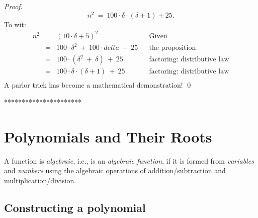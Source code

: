 {\begin{proof}
\[ n^2 \ = \ 100 \cdot \delta \cdot (\delta+1) + 25. \]
To wit: 
\[
\begin{array}{lclll}
n^2 & = & (10 \cdot \delta + 5)^2 & & \mbox{Given} \\
    & = & 100 \cdot \delta^2 \ + \ 100 \cdot delta \ + \ 25
              & & \mbox{the proposition} \\
    & = & 100 \cdot (\delta^2 \ + \ \delta) \ + \ 25
              & & \mbox{factoring: distributive law} \\
    & = & 100 \cdot \delta \cdot (\delta + 1) \ + \ 25
              & & \mbox{factoring: distributive law} \\
\end{array}
\]
A parlor trick has become a mathematical demonstration!
\qed
\end{proof}
**********************}


\section{Polynomials and Their Roots}
\label{sec:polynomials}

 
A function is {\it algebraic}, i.e., is an {\it algebraic function},
if it is formed from {\it variables} and {\it numbers} using the
algebraic operations of addition/subtraction and
multiplication/division. 

\subsection{Constructing a polynomial}
\label{sec:make-a-poly}

